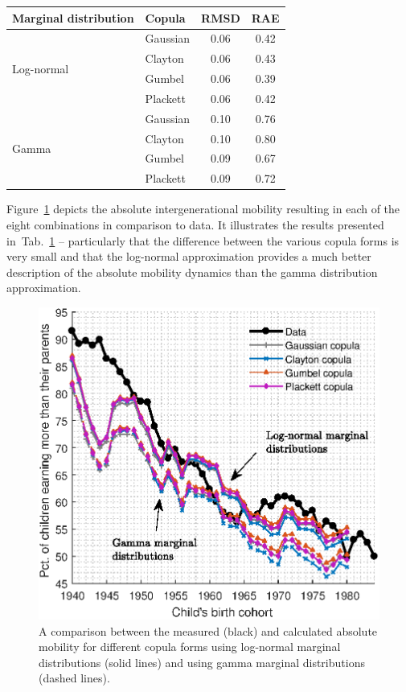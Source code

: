\documentclass[12pt]{article}
\newcommand{\ra}[1]{\renewcommand{\arraystretch}{#1}}
\newcommand{\flabel}[1]{\label{fig:#1}}
\newcommand{\Fref}[1]{Figure~\ref{fig:#1}}
\newcommand{\tlabel}[1]{\label{tab:#1}}
\newcommand{\tref}[1]{Tab.~\ref{tab:#1}}
\numberwithin{equation}{section}
\begin{document}
\begin{table}[!htb]
\ra{1.1}
\centering
{}\tlabel{robust}
\begin{tabular}{@{}llcc@{}}\toprule[1.5pt]
Marginal distribution & Copula & RMSD & RAE\\
\midrule[1.5pt]
\multirow{ 4}{*}{Log-normal}
& Gaussian & 0.06 & 0.42\\
& Clayton & 0.06 & 0.43\\
& Gumbel &  0.06 & 0.39\\
& Plackett & 0.06 & 0.42\\
\midrule[1.5pt]
\multirow{ 4}{*}{Gamma}
& Gaussian  & 0.10 & 0.76\\
& Clayton  & 0.10 & 0.80\\
& Gumbel  & 0.09 & 0.67\\
& Plackett & 0.09 & 0.72\\
\bottomrule[1.5pt]
\end{tabular}
\end{table}

\Fref{copulas1} depicts the absolute intergenerational mobility resulting in each of the eight combinations in comparison to data. It illustrates the results presented in~\tref{robust} -- particularly that the difference between the various copula forms is very small and that the log-normal approximation provides a much better description of the absolute mobility dynamics than the gamma distribution approximation.

\begin{figure}[!htb]
\centering
\includegraphics[width=1.0\textwidth]{./figs/copulas3.eps}
\caption{A comparison between the measured (black) and calculated absolute mobility for different copula forms using log-normal marginal distributions (solid lines) and using gamma marginal distributions (dashed lines).}
\flabel{copulas1}
\end{figure}
\end{document}

